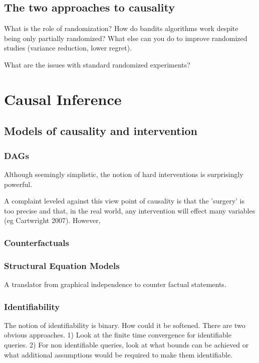 \documentclass[11pt,a4paper]{article}
\begin{document}
\subsection*{The two approaches to causality}

What is the role of randomization? How do bandits algorithms work despite being only partially randomized? 
What else can you do to improve randomized studies (variance reduction, lower regret).

What are the issues with standard randomized experiments?


\section*{Causal Inference}

\subsection*{Models of causality and intervention}
\subsubsection*{DAGs}

Although seemingly simplistic, the notion of hard interventions is surprisingly powerful. 

A complaint leveled against this view point of causality is that the 'surgery' is too precise and that, in the real world, any intervention will effect many variables (eg Cartwright 2007). However, 

\subsubsection*{Counterfactuals}

\subsubsection*{Structural Equation Models}

A translator from graphical independence to counter factual statements. 

\subsubsection*{Identifiability}

The notion of identifiability is binary. How could it be softened. There are two obvious approaches. 
1) Look at the finite time convergence for identifiable queries.
2) For non identifiable queries, look at what bounds can be achieved or what additional assumptions would be required to make them identifiable. 
\end{document}
